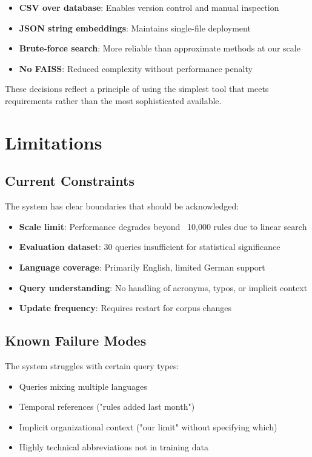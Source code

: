 \begin{itemize}[leftmargin=*,itemsep=2pt,topsep=2pt]
  \item \textbf{CSV over database}: Enables version control and manual inspection
  \item \textbf{JSON string embeddings}: Maintains single-file deployment
  \item \textbf{Brute-force search}: More reliable than approximate methods at our scale
  \item \textbf{No FAISS}: Reduced complexity without performance penalty
\end{itemize}

These decisions reflect a principle of using the simplest tool that meets requirements rather than the most sophisticated available.

\section{Limitations}

\subsection{Current Constraints}

The system has clear boundaries that should be acknowledged:

\begin{itemize}[leftmargin=*,itemsep=2pt,topsep=2pt]
  \item \textbf{Scale limit}: Performance degrades beyond ~10,000 rules due to linear search
  \item \textbf{Evaluation dataset}: 30 queries insufficient for statistical significance
  \item \textbf{Language coverage}: Primarily English, limited German support
  \item \textbf{Query understanding}: No handling of acronyms, typos, or implicit context
  \item \textbf{Update frequency}: Requires restart for corpus changes
\end{itemize}

\subsection{Known Failure Modes}

The system struggles with certain query types:

\begin{itemize}[leftmargin=*,itemsep=2pt,topsep=2pt]
  \item Queries mixing multiple languages
  \item Temporal references ("rules added last month")
  \item Implicit organizational context ("our limit" without specifying which)
  \item Highly technical abbreviations not in training data
\end{itemize}

